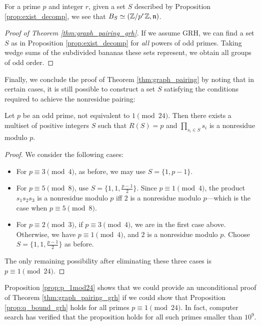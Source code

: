 \documentclass{amsart}
\begin{document}
For a prime $p$ and integer $r$, given a set $S$ described by
Proposition \ref{prop:exist_decomp}, we see that $B_S \simeq
(\mathbb{Z}/p^r\mathbb{Z}, \mathfrak{n})$.

\begin{proof}[Proof of Theorem \ref{thm:graph_pairing_grh}]
  If we assume GRH, we can find a set $S$ as in Proposition
  \ref{prop:exist_decomp} for \emph{all} powers of odd primes. Taking
  wedge sums of the subdivided bananas these sets represent, we obtain
  all groups of odd order.
\end{proof}

Finally, we conclude the proof of Theorem \ref{thm:graph_pairing} by
noting that in certain cases, it is still possible to construct a set
$S$ satisfying the conditions required to achieve the nonresidue
pairing:

\begin{prop}
  \label{prop:p_1mod24}
  Let $p$ be an odd prime, not equivalent to $1 \pmod {24}$. Then
  there exists a multiset of positive integers $S$ such that $R(S) =
  p$ and $\prod_{s_i \in S}s_i$ is a nonresidue modulo $p$.
\end{prop}
\begin{proof}
  We consider the following cases:
  \begin{itemize}
  \item For $p \equiv 3 \pmod 4$, as before, we may use $S = \{1,
    p-1\}$.
  \item For $p \equiv 5 \pmod 8$, use $S = \{1, 1,
    \frac{p-1}{2}\}$. Since $p \equiv 1 \pmod 4$, the product
    $s_1s_2s_3$ is a nonresidue modulo $p$ iff $2$ is a nonresidue
    modulo $p$---which is the case when $p \equiv 5 \pmod 8$.
  \item For $p \equiv 2 \pmod 3$, if $p \equiv 3 \pmod 4$, we are in
    the first case above. Otherwise, we have $p \equiv 1 \pmod 4$, and
    $2$ is a nonresidue modulo $p$. Choose $S = \{1, 1,
    \frac{p-1}{2}\}$ as before.
  \end{itemize}
  
  The only remaining possibility after eliminating these three cases
  is $p \equiv 1 \pmod {24}$.
\end{proof}

\begin{remark}
  Proposition \ref{prop:p_1mod24} shows that we could provide an
  unconditional proof of Theorem \ref{thm:graph_pairing_grh} if we
  could show that Proposition \ref{prop:q_bound_grh} holds for all
  primes $p \equiv 1 \pmod {24}$. In fact, computer search has
  verified that the proposition holds for all such primes smaller than
  $10^9$.
\end{remark}
\end{document}
